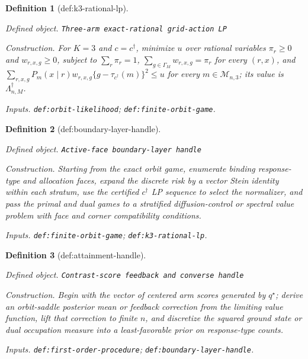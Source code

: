 \documentclass{article}
\newtheorem{definition}{Definition}
\begin{document}
\begin{definition}[def:k3-rational-lp]\label{def:k3-rational-lp}
\par\smallskip\noindent\emph{Defined object.} \texttt{Three-\allowbreak{}arm exact-\allowbreak{}rational grid-\allowbreak{}action LP}
\par\smallskip\noindent\emph{Construction.} For \(K=3\) and \(c=c^\dagger\), minimize \(u\) over rational variables \(\pi_r\ge0\) and \(w_{r,x,g}\ge0\), subject to \(\sum_r\pi_r=1\), \(\sum_{g\in\Gamma_M}w_{r,x,g}=\pi_r\) for every \((r,x)\), and \(\sum_{r,x,g}P_m(x\mid r)w_{r,x,g}\{g-\tau_{c^\dagger}(m)\}^2\le u\) for every \(m\in\mathcal M_{n,3}\); its value is \(\Lambda_{n,M}^\dagger\).
\par\smallskip\noindent\emph{Inputs.} \texttt{def:\allowbreak{}orbit-\allowbreak{}likelihood}; \texttt{def:\allowbreak{}finite-\allowbreak{}orbit-\allowbreak{}game}.
\end{definition}

\begin{definition}[def:boundary-layer-handle]\label{def:boundary-layer-handle}
\par\smallskip\noindent\emph{Defined object.} \texttt{Active-\allowbreak{}face boundary-\allowbreak{}layer handle}
\par\smallskip\noindent\emph{Construction.} Starting from the exact orbit game, enumerate binding response-type and allocation faces, expand the discrete risk by a vector Stein identity within each stratum, use the certified \(c^\dagger\) LP sequence to select the normalizer, and pass the primal and dual games to a stratified diffusion-control or spectral value problem with face and corner compatibility conditions.
\par\smallskip\noindent\emph{Inputs.} \texttt{def:\allowbreak{}finite-\allowbreak{}orbit-\allowbreak{}game}; \texttt{def:\allowbreak{}k3-\allowbreak{}rational-\allowbreak{}lp}.
\end{definition}

\begin{definition}[def:attainment-handle]\label{def:attainment-handle}
\par\smallskip\noindent\emph{Defined object.} \texttt{Contrast-\allowbreak{}score feedback and converse handle}
\par\smallskip\noindent\emph{Construction.} Begin with the vector of centered arm scores generated by \(q^\star\); derive an orbit-saddle posterior mean or feedback correction from the limiting value function, lift that correction to finite \(n\), and discretize the squared ground state or dual occupation measure into a least-favorable prior on response-type counts.
\par\smallskip\noindent\emph{Inputs.} \texttt{def:\allowbreak{}first-\allowbreak{}order-\allowbreak{}procedure}; \texttt{def:\allowbreak{}boundary-\allowbreak{}layer-\allowbreak{}handle}.
\end{definition}
\end{document}
